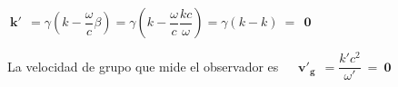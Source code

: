 \color{NavyBlue}
$\boldsymbol{ \boxed{ \ k'\ }} \ = \gamma \left(  k - \dfrac \omega c \beta \right) = \gamma \left(k-\dfrac \omega c \dfrac {kc}{\omega} \right) = \gamma (k-k) \ = \ \boldsymbol{ \boxed{ \ 0 \ }}$


La velocidad de grupo que mide el observador es  $\quad \boldsymbol{ \boxed{ \ v'_g \ }} \ = \dfrac{k'c^2}{\omega'} \ = \boldsymbol{ \boxed{ \ 0 \ }}$

\color{black}


	




	




